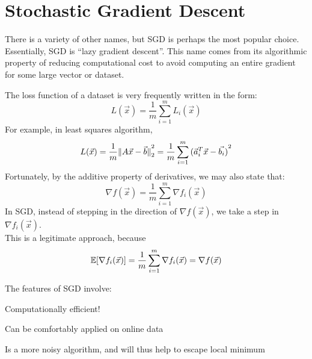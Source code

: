 \section{Stochastic Gradient Descent}
There is a variety of other names, but SGD is perhaps the most popular choice. \\
Essentially, SGD is ``lazy gradient descent''.
This name comes from its algorithmic property of reducing computational cost to avoid computing an entire gradient for some large vector or dataset.

The loss function of a dataset is very frequently written in the form:
\[
    L(\vec{x}) = \frac{1}{m} \sum_{i = 1}^m L_i (\vec{x})
\]
For example, in least squares algorithm,
\[
    L(\vec{x}) = \frac{1}{m} \pnorm[2]{A \vec{x} - \vec{b}}{2} = \frac{1}{m} \sum_{i = 1}^m {(\vec{a}_i^T \vec{x} - \vec{b_i})}^2
\]
Fortunately, by the additive property of derivatives, we may also state that:
\[
    \nabla f(\vec{x}) = \frac{1}{m} \sum_{i = 1}^m \nabla f_i(\vec{x})
\]
In SGD, instead of stepping in the direction of $\nabla f(\vec{x})$, we take a step in $\nabla f_i (\vec{x})$. \\
This is a legitimate approach, because
\[
    \E[\nabla f_i(\vec{x})] = \frac{1}{m} \sum_{i = 1}^m \nabla f_i (\vec{x}) = \nabla f(\vec{x})
\]

The features of SGD involve:
\begin{bindenum}
    \item Computationally efficient!
    \item Can be comfortably applied on online data
    \item Is a more noisy algorithm, and will thus help to escape local minimum
\end{bindenum}


